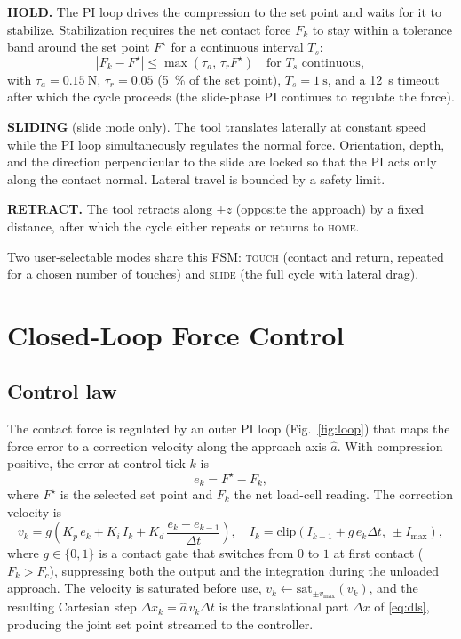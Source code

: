 \documentclass[conference]{IEEEtran}
\begin{document}
\textbf{HOLD.} The PI loop drives the compression to the set point and waits for
it to stabilize. Stabilization requires the net contact force $F_k$ to stay within
a tolerance band around the set point $F^\star$ for a continuous interval $T_s$:
\begin{equation}
|F_k - F^\star| \le \max(\tau_a,\, \tau_r F^\star)\quad\text{for } T_s
\text{ continuous},
\label{eq:hold}
\end{equation}
with $\tau_a=\SI{0.15}{\newton}$, $\tau_r=0.05$ (\SI{5}{\percent} of the set point),
$T_s=\SI{1}{\second}$, and a \SI{12}{\second} timeout after which the cycle
proceeds (the slide-phase PI continues to regulate the force).

\textbf{SLIDING} (slide mode only). The tool translates laterally at constant
speed while the PI loop simultaneously regulates the normal force. Orientation,
depth, and the direction perpendicular to the slide are locked so that the PI
acts only along the contact normal. Lateral travel is bounded by a safety limit.

\textbf{RETRACT.} The tool retracts along $+z$ (opposite the approach) by a fixed
distance, after which the cycle either repeats or returns to \textsc{home}.

Two user-selectable modes share this FSM: \textsc{touch} (contact and return,
repeated for a chosen number of touches) and \textsc{slide} (the full cycle with
lateral drag).

\section{Closed-Loop Force Control}
\label{sec:force}
\subsection{Control law}
The contact force is regulated by an outer PI loop (Fig.~\ref{fig:loop}) that maps
the force error to a correction velocity along the approach axis $\hat a$. With
compression positive,
the error at control tick $k$ is
\begin{equation}
e_k = F^\star - F_k,
\label{eq:err}
\end{equation}
where $F^\star$ is the selected set point and $F_k$ the net load-cell reading.
The correction velocity is
\begin{equation}
v_k = g\left(K_p\,e_k + K_i\,I_k + K_d\,\frac{e_k-e_{k-1}}{\Delta t}\right),
\quad
I_k = \mathrm{clip}\!\left(I_{k-1}+g\,e_k\Delta t,\ \pm I_{\max}\right),
\label{eq:pid}
\end{equation}
where $g\in\{0,1\}$ is a contact gate that switches from $0$ to $1$ at first
contact ($F_k>F_c$), suppressing both the output and the integration during the
unloaded approach. The velocity is saturated before use,
$v_k \leftarrow \mathrm{sat}_{\pm v_{\max}}(v_k)$, and the resulting Cartesian
step $\Delta x_k = \hat a\, v_k \Delta t$ is the translational part $\Delta x$ of
\eqref{eq:dls}, producing the joint set point streamed to the controller.
\end{document}
